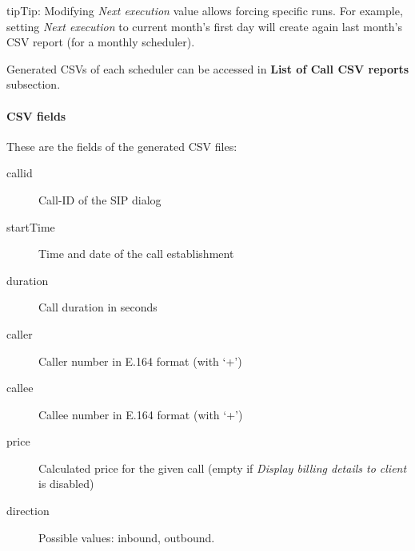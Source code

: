 \documentclass[letterpaper,10pt,english]{sphinxmanual}
\begin{document}
\begin{notice}{tip}{Tip:}
Modifying \emph{Next execution} value allows forcing specific runs. For example, setting \emph{Next execution} to
current month's first day will create again last month's CSV report (for a monthly scheduler).
\end{notice}

Generated CSVs of each scheduler can be accessed in \textbf{List of Call CSV reports} subsection.


\paragraph{CSV fields}
\label{administration_portal/client/retail/calls/call_csv_schedulers:csv-fields}
These are the fields of the generated CSV files:
\begin{description}
\item[{callid}] \leavevmode{}\label{administration_portal/client/retail/calls/call_csv_schedulers:term-callid}
Call-ID of the SIP dialog

\item[{startTime}] \leavevmode{}\label{administration_portal/client/retail/calls/call_csv_schedulers:term-starttime}
Time and date of the call establishment

\item[{duration}] \leavevmode{}\label{administration_portal/client/retail/calls/call_csv_schedulers:term-duration}
Call duration in seconds

\item[{caller}] \leavevmode{}\label{administration_portal/client/retail/calls/call_csv_schedulers:term-caller}
Caller number in E.164 format (with `+')

\item[{callee}] \leavevmode{}\label{administration_portal/client/retail/calls/call_csv_schedulers:term-callee}
Callee number in E.164 format (with `+')

\item[{price}] \leavevmode{}\label{administration_portal/client/retail/calls/call_csv_schedulers:term-price}
Calculated price for the given call (empty if \emph{Display billing details to client} is disabled)

\item[{direction}] \leavevmode{}\label{administration_portal/client/retail/calls/call_csv_schedulers:term-14}
Possible values: inbound, outbound.


\end{description}
\end{document}
